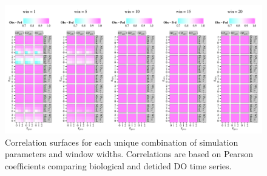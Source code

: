 \documentclass{article}\usepackage[]{graphicx}\usepackage[]{color}
\makeatletter
\def\maxwidth{ %
  \ifdim\Gin@nat@width>\linewidth
    \linewidth
  \else
    \Gin@nat@width
  \fi
}
\newenvironment{knitrout}{}{} %
\makeatother
\begin{document}
\begin{landscape}
\centering\vspace*{\fill}
\begin{knitrout}
\color{fgcolor}\begin{figure}[!h]


{\centering \includegraphics[width=\maxwidth]{figure/cor_surf} 

}

\caption[Correlation surfaces for each unique combination of simulation parameters and window widths]{Correlation surfaces for each unique combination of simulation parameters and window widths.  Correlations are based on Pearson coefficients comparing biological and detided DO time series.\label{fig:cor_surf}}
\end{figure}


\end{knitrout}
\vfill
\end{landscape}
\clearpage



\clearpage

\vfill


\vfill
\clearpage
\end{document}

